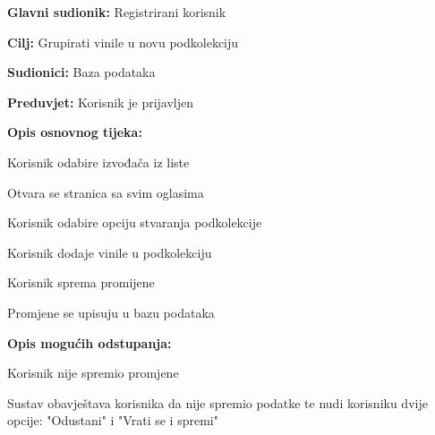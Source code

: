 				\noindent {}
					\begin{packed_item}
	
						\item \textbf{Glavni sudionik: }Registrirani korisnik
						\item  \textbf{Cilj:} Grupirati vinile u novu podkolekciju
						\item  \textbf{Sudionici:} Baza podataka
						\item  \textbf{Preduvjet:} Korisnik je prijavljen
						\item  \textbf{Opis osnovnog tijeka:}
						
						\item[] \begin{packed_enum}
	
							\item Korisnik odabire izvođača iz liste
							\item Otvara se stranica sa svim oglasima
							\item Korisnik odabire opciju stvaranja podkolekcije
							\item Korisnik dodaje vinile u podkolekciju
							\item Korisnik sprema promijene
							\item Promjene se upisuju u bazu podataka

						\end{packed_enum}
						
						\item  \textbf{Opis mogućih odstupanja:}
						
						\item[] \begin{packed_item}
	
							\item[5.a] Korisnik nije spremio promjene
								\begin{packed_item}
									\item Sustav obavještava korisnika da nije spremio podatke te nudi korisniku dvije opcije: "Odustani" i "Vrati se i spremi"
								\end{packed_item}
								
						\end{packed_item}							
					\end{packed_item}
					
